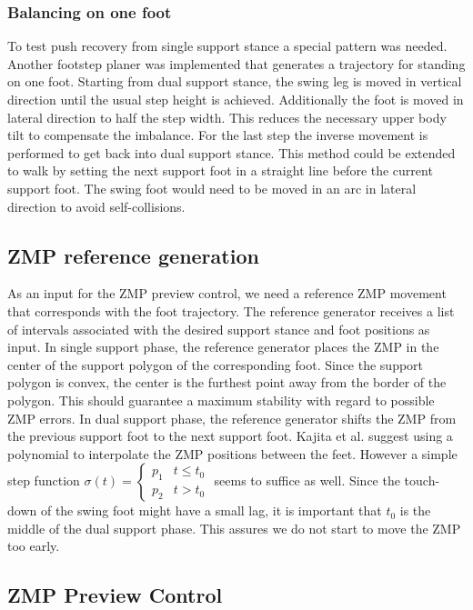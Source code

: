 \documentclass[english,ngerman]{KITreprt}
\begin{document}
\subsubsection{Balancing on one foot}\label{balancing-on-one-foot}

To test push recovery from single support stance a special pattern was
needed. Another footstep planer was implemented that generates a
trajectory for standing on one foot. Starting from dual support stance,
the swing leg is moved in vertical direction until the usual step height
is achieved. Additionally the foot is moved in lateral direction to half
the step width. This reduces the necessary upper body tilt to compensate
the imbalance. For the last step the inverse movement is performed to
get back into dual support stance. This method could be extended to walk
by setting the next support foot in a straight line before the current
support foot. The swing foot would need to be moved in an arc in lateral
direction to avoid self-collisions.

\subsection{ZMP reference generation}\label{zmp-reference-generation}

As an input for the ZMP preview control, we need a reference ZMP
movement that corresponds with the foot trajectory. The reference
generator receives a list of intervals associated with the desired
support stance and foot positions as input. In single support phase, the
reference generator places the ZMP in the center of the support polygon
of the corresponding foot. Since the support polygon is convex, the
center is the furthest point away from the border of the polygon. This
should guarantee a maximum stability with regard to possible ZMP errors.
In dual support phase, the reference generator shifts the ZMP from the
previous support foot to the next support foot. Kajita et al. suggest
using a polynomial to interpolate the ZMP positions between the feet.
However a simple step function
$\sigma(t) = \left\{\begin{array}{lr}p_1 & t \leq t_0 \\ p_2 & t > t_0 \end{array}\right.$
seems to suffice as well. Since the touch-down of the swing foot might
have a small lag, it is important that $t_0$ is the middle of the dual
support phase. This assures we do not start to move the ZMP too early.

\subsection{ZMP Preview Control}\label{zmp-preview-control}
\end{document}
